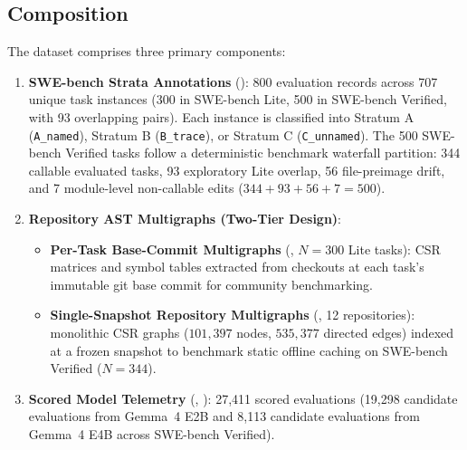 \subsection{Composition}
The dataset comprises three primary components:
\begin{enumerate}[noitemsep,topsep=2pt,parsep=0pt,partopsep=0pt]
    \item \textbf{SWE-bench Strata Annotations} (): 800 evaluation records across 707 unique task instances (300 in SWE-bench Lite, 500 in SWE-bench Verified, with 93 overlapping pairs). Each instance is classified into Stratum A (\texttt{A\_named}), Stratum B (\texttt{B\_trace}), or Stratum C (\texttt{C\_unnamed}). The 500 SWE-bench Verified tasks follow a deterministic benchmark waterfall partition: 344 callable evaluated tasks, 93 exploratory Lite overlap, 56 file-preimage drift, and 7 module-level non-callable edits ($344 + 93 + 56 + 7 = 500$).
    \item \textbf{Repository AST Multigraphs (Two-Tier Design)}:
    \begin{itemize}[noitemsep,topsep=1pt,parsep=0pt,partopsep=0pt]
        \item \textbf{Per-Task Base-Commit Multigraphs} (, $N=300$ Lite tasks): CSR matrices and symbol tables extracted from checkouts at each task's immutable git base commit for community benchmarking.
        \item \textbf{Single-Snapshot Repository Multigraphs} (, 12 repositories): monolithic CSR graphs ($101{,}397$ nodes, $535{,}377$ directed edges) indexed at a frozen snapshot to benchmark static offline caching on SWE-bench Verified ($N=344$).
    \end{itemize}
    \item \textbf{Scored Model Telemetry} (, ): 27{,}411 scored evaluations (19{,}298 candidate evaluations from Gemma~4 E2B and 8{,}113 candidate evaluations from Gemma~4 E4B across SWE-bench Verified).
\end{enumerate}

